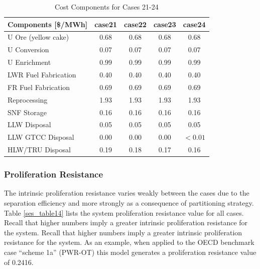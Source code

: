 \begin{table}[htbp]
\begin{center}
\caption{Cost Components for Cases 21-24}
\label{ses_table13_2}
\begin{tabular}{|l|c|c|c|c|}
\hline
\textbf{Components [\$/MWh]} & \textbf{case21} & \textbf{case22} & \textbf{case23} & \textbf{case24} \\
\hline
U Ore (yellow cake)          & 0.68            & 0.68            & 0.68            & 0.68 \\
U Conversion                 & 0.07            & 0.07            & 0.07            & 0.07 \\
U Enrichment                 & 0.99            & 0.99            & 0.99            & 0.99 \\
LWR Fuel Fabrication         & 0.40            & 0.40            & 0.40            & 0.40 \\
FR Fuel Fabrication          & 0.69            & 0.69            & 0.69            & 0.69 \\
Reprocessing                 & 1.93            & 1.93            & 1.93            & 1.93 \\
SNF Storage                  & 0.16            & 0.16            & 0.16            & 0.16 \\
LLW Disposal                 & 0.05            & 0.05            & 0.05            & 0.05 \\
LLW GTCC Disposal            & 0.00            & 0.00            & 0.00            & $<0.01$ \\
HLW/TRU Disposal             & 0.19            & 0.18            & 0.17            & 0.16 \\
\hline
\end{tabular}
\end{center}
\end{table}



\subsubsection{Proliferation Resistance}
\label{ses_sec:prilif_res}
The intrinsic proliferation resistance varies weakly between the cases
due to the separation efficiency and more strongly as a consequence of
partitioning strategy.  Table \ref{ses_table14} lists the system proliferation
resistance value for all cases.  Recall that higher numbers imply a
greater intrinsic proliferation resistance for the system.  Recall that
higher numbers imply a greater intrinsic proliferation resistance for
the system.  As an example, when applied to the OECD benchmark case
``scheme 1a'' (PWR-OT) this model generates a proliferation resistance
value of 0.2416.

